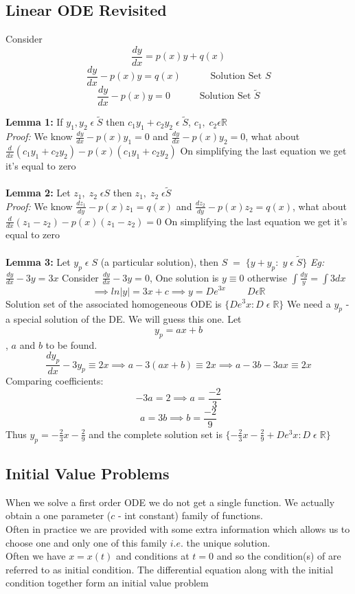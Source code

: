 \documentclass[11pt]{article}
\theoremstyle{definition}
\newcommand{\R}{\mathbb{R}}
\begin{document}
\subsection{Linear ODE Revisited}
Consider $$\frac{dy}{dx} = p(x)y + q(x)$$
$$\frac{dy}{dx} - p(x)y = q(x) \;\;\;\;\;\;\;\;\;\;\;\text{Solution Set } S$$
$$\frac{dy}{dx} - p(x)y = 0 \;\;\;\;\;\;\;\;\;\;\;\text{Solution Set } \widetilde{S}$$

\textbf{Lemma 1:} If $y_1, y_2\; \epsilon\; \widetilde{S}$ then $c_1y_1 + c_2y_2\; \epsilon\; \widetilde{S}$, $c_1,\; c_2 \epsilon \R$ \\
\textit{Proof:} We know $\frac{dy}{dx} - p(x)y_1 = 0$ and $\frac{dy}{dx} - p(x)y_2 = 0$, what about $\frac{d}{dx}(c_1y_1 + c_2y_2) -p(x)(c_1y_1 + c_2y_2)$ On simplifying the last equation we get it's equal to zero \\\\
\textbf{Lemma 2:} Let $z_1,\;z_2\;\epsilon S$ then  $z_1,\;z_2\;\epsilon \widetilde{S}$\\
\textit{Proof:} We know $\frac{dz_1}{dy} - p(x)z_1 = q(x)$ and $\frac{dz_2}{dy} - p(x)z_2 = q(x)$, what about $\frac{d}{dx}(z_1-z_2) -p(x)(z_1-z_2) = 0$ On simplifying the last equation we get it's equal to zero \\\\
\textbf{Lemma 3:} Let $y_p\; \epsilon\; S$ (a particular solution), then $S\; =\; \{y+y_p:\; y\; \epsilon\; \widetilde{S}\}$
\textit{Eg: } $\frac{dy}{dx} -3y = 3x$
Consider  $\frac{dy}{dx} -3y = 0$, One solution is $y\equiv 0$ otherwise $\int\frac{dy}{y} = \int3dx$
$$\implies ln|y| = 3x + c \implies y = De^{3x}\;\;\;\;\;\;\;\; D \epsilon \R$$ Solution set of the associated homogeneous ODE is $\{De^3x: D\; \epsilon\; \R\}$
We need a $y_p$ - a special solution of the DE. We will guess this one. Let $$y_p = ax+b$$, $a$ and $b$ to be found.
$$\frac{dy_p}{dx} - 3y_p \equiv 2x \implies a -3(ax + b) \equiv 2x \implies a-3b - 3ax \equiv 2x$$
Comparing coefficients:
$$-3a = 2 \implies a = \frac{-2}{3}$$
$$a = 3b \implies b = \frac{-2}{9}$$
Thus $y_p = -\frac{2}{3}x - \frac{2}{9}$ and the complete solution set is $\{-\frac{2}{3}x - \frac{2}{9} + De^3x: D\; \epsilon\; \R\}$
\pagebreak
\subsection{Initial Value Problems}
When we solve a first order ODE we do not get a single function. We actually obtain a one parameter ($c$ - int constant) family of functions.\\
Often in practice we are provided with some extra information which allows us to choose one and only one of this family $i.e.$ the unique solution.\\
Often we have $x = x(t)$ and conditions at $t = 0$ and so the condition(s) of are referred to as initial condition.
The differential equation along with the initial condition together form an initial value problem
\end{document}
